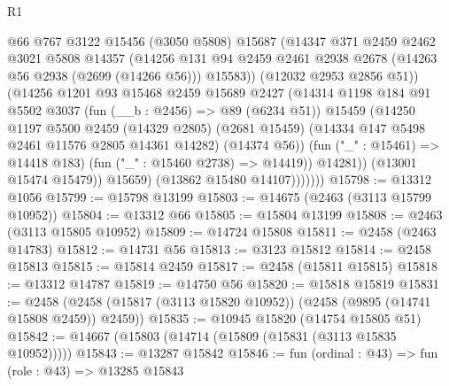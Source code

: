 \begin{lexlean}{R1}
\begin{coremodule}
                        @66
                        @767
                        @3122
                        @15456
                        (@3050 @5808)
                        @15687
                        (@14347
                          @371
                          @2459
                          @2462
                          @3021
                          @5808
                          @14357
                          (@14256
                            @131
                            @94
                            @2459
                            @2461
                            @2938
                            @2678
                            (@14263 @56 @2938 (@2699 (@14266 @56)))
                            @15583))
                        (@12032 @2953 @2856 @51))
                      (@14256
                        @1201
                        @93
                        @15468
                        @2459
                        @15689
                        @2427
                        (@14314
                          @1198
                          @184
                          @91
                          @5502
                          @3037
                          (fun (__b : @2456) => @89 (@6234 @51))
                          @15459
                          (@14250
                            @1197
                            @5500
                            @2459
                            (@14329 @2805)
                            (@2681 @15459)
                            (@14334 @147 @5498 @2461 @11576 @2805 @14361 @14282)
                            (@14374 @56))
                          (fun ("_" : @15461) => @14418 @183)
                          (fun ("_" : @15460 @2738) => @14419))
                        @14281))
                    (@13001 @15474 @15479))
                  @15659)
                (@13862 @15480 @14107)))))))
@15798 := @13312 @1056
@15799 := @15798 @13199
@15803 := @14675 (@2463 (@3113 @15799 @10952))
@15804 := @13312 @66
@15805 := @15804 @13199
@15808 := @2463 (@3113 @15805 @10952)
@15809 := @14724 @15808
@15811 := @2458 (@2463 @14783)
@15812 := @14731 @56
@15813 := @3123 @15812
@15814 := @2458 @15813
@15815 := @15814 @2459
@15817 := @2458 (@15811 @15815)
@15818 := @13312 @14787
@15819 := @14750 @56
@15820 := @15818 @15819
@15831 := @2458 (@2458 (@15817 (@3113 @15820 @10952)) (@2458 (@9895 (@14741 @15808 @2459)) @2459))
@15835 := @10945 @15820 (@14754 @15805 @51)
@15842 := @14667 (@15803 (@14714 (@15809 (@15831 (@3113 @15835 @10952)))))
@15843 := @13287 @15842
@15846 := fun (ordinal : @43) => fun (role : @43) => @13285 @15843

\end{coremodule}
\end{lexlean}
